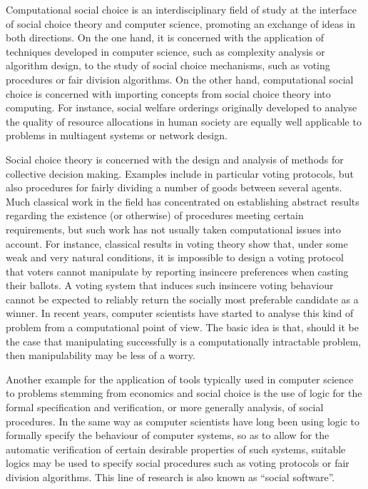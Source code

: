 \documentclass{comsoc2008}
\begin{document}
Computational social choice \cite{ChevaleyreEtAlSOFSEM2007} is an 
interdisciplinary field of study at the interface of social choice theory 
and computer science, promoting an exchange of ideas in both directions. 
On the one hand, it is concerned with the application of techniques 
developed in computer science, such as complexity analysis or algorithm 
design, to the study of social choice mechanisms, such as voting procedures 
or fair division algorithms. On the other hand, computational social choice 
is concerned with importing concepts from social choice theory into computing. 
For instance, social welfare orderings originally developed to analyse the 
quality of resource allocations in human society are equally well applicable 
to problems in multiagent systems or network design.

Social choice theory is concerned with the design and analysis of methods for 
collective decision making. Examples include in particular voting protocols, 
but also procedures for fairly dividing a number of goods between several agents. 
Much classical work in the field has concentrated on establishing abstract 
results regarding the existence (or otherwise) of procedures meeting certain 
requirements, but such work has not usually taken computational issues into 
account. For instance, classical results in voting theory show that, under 
some weak and very natural conditions, it is impossible to design a voting 
protocol that voters cannot manipulate by reporting insincere preferences when 
casting their ballots. A voting system that induces such insincere voting 
behaviour cannot be expected to reliably return the socially most preferable 
candidate as a winner. In recent years, computer scientists have started to 
analyse this kind of problem from a computational point of view. The basic 
idea is that, should it be the case that manipulating successfully is a 
computationally intractable problem, then manipulability may be less of a worry.

Another example for the application of tools typically used in computer science 
to problems stemming from economics and social choice is the use of logic for 
the formal specification and verification, or more generally analysis, of 
social procedures. In the same way as computer scientists have long been using 
logic to formally specify the behaviour of computer systems, so as to allow for 
the automatic verification of certain desirable properties of such systems, 
suitable logics may be used to specify social procedures such as voting 
protocols or fair division algorithms. This line of research is also known 
as ``social software''.
\end{document}
